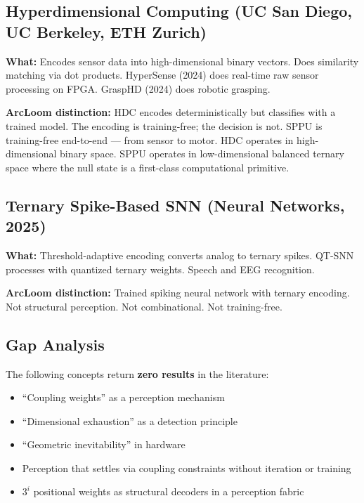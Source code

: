\documentclass[11pt, a4paper]{article}
\begin{document}
\subsection{Hyperdimensional Computing (UC San Diego, UC Berkeley, ETH Zurich)}

\textbf{What:} Encodes sensor data into high-dimensional binary vectors.
Does similarity matching via dot products. HyperSense (2024) does
real-time raw sensor processing on FPGA. GraspHD (2024) does robotic
grasping.

\textbf{ArcLoom distinction:} HDC encodes deterministically but
classifies with a trained model. The encoding is training-free; the
decision is not. SPPU is training-free end-to-end --- from sensor to
motor. HDC operates in high-dimensional binary space. SPPU operates
in low-dimensional balanced ternary space where the null state is a
first-class computational primitive.

\subsection{Ternary Spike-Based SNN (Neural Networks, 2025)}

\textbf{What:} Threshold-adaptive encoding converts analog to ternary
spikes. QT-SNN processes with quantized ternary weights. Speech and
EEG recognition.

\textbf{ArcLoom distinction:} Trained spiking neural network with
ternary encoding. Not structural perception. Not combinational.
Not training-free.

\subsection{Gap Analysis}

The following concepts return \textbf{zero results} in the literature:
\begin{itemize}[nosep]
  \item ``Coupling weights'' as a perception mechanism
  \item ``Dimensional exhaustion'' as a detection principle
  \item ``Geometric inevitability'' in hardware
  \item Perception that settles via coupling constraints without
        iteration or training
  \item $3^i$ positional weights as structural decoders in a
        perception fabric
\end{itemize}
\end{document}
